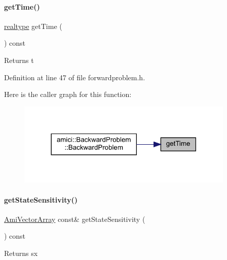 \paragraph{\texorpdfstring{getTime()}{getTime()}}
{\footnotesize\ttfamily \mbox{\hyperlink{namespaceamici_a1bdce28051d6a53868f7ccbf5f2c14a3}{realtype}} get\+Time (\begin{DoxyParamCaption}{ }\end{DoxyParamCaption}) const}

\begin{DoxyReturn}{Returns}
t 
\end{DoxyReturn}


Definition at line 47 of file forwardproblem.\+h.

Here is the caller graph for this function\+:
\nopagebreak
\begin{figure}[H]
\begin{center}
\leavevmode
\includegraphics[width=294pt]{classamici_1_1_forward_problem_a1bc77462943aa0bae032ffa5d6e887ee_icgraph}
\end{center}
\end{figure}
\mbox{\label{classamici_1_1_forward_problem_a3c364a12c650f9f247f664cedb6d81d3}} 
\paragraph{\texorpdfstring{getStateSensitivity()}{getStateSensitivity()}}
{\footnotesize\ttfamily \mbox{\hyperlink{classamici_1_1_ami_vector_array}{Ami\+Vector\+Array}} const\& get\+State\+Sensitivity (\begin{DoxyParamCaption}{ }\end{DoxyParamCaption}) const}

\begin{DoxyReturn}{Returns}
sx 
\end{DoxyReturn}


